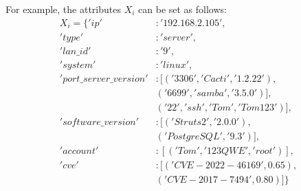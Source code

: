 For example, the attributes $ X_i $ can be set as follows:
\begin{equation}
    \begin{aligned}
        X_i = \{
        'ip'&: '192.168.2.105',\\
        'type'&: 'server', \\
        'lan\_id'&: '9', \\
        'system'&: 'linux',\\
        'port\_server\_version'&: [('3306', 'Cacti', '1.2.22'),\\
        & ('6699', 'samba', '3.5.0') ],\\
        & ('22', 'ssh', 'Tom', 'Tom123') ],\\
        'software\_version'&:[('Struts2', '2.0.0'), \\
        &('PostgreSQL', '9.3')],\\
        'account'&:[('Tom','123QWE','root')],\\
        'cve'&:[('CVE-2022-46169',0.65), \\
        &('CVE-2017-7494',0.80)]\}
    \end{aligned}
\end{equation}

